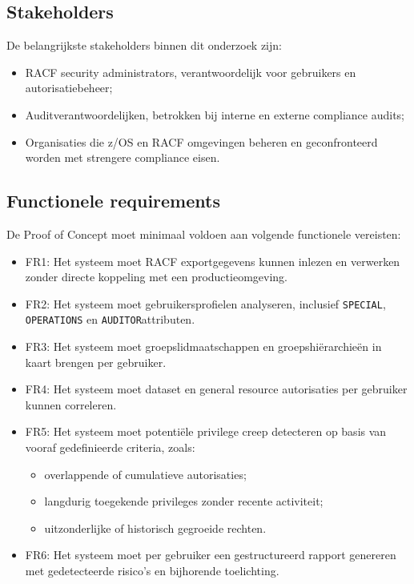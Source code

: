 \subsection{Stakeholders}

De belangrijkste stakeholders binnen dit onderzoek zijn:
\begin{itemize}
	\item RACF security administrators, verantwoordelijk voor gebruikers en autorisatiebeheer;
	\item Auditverantwoordelijken, betrokken bij interne en externe compliance audits;
	\item Organisaties die z/OS en RACF omgevingen beheren en geconfronteerd worden met strengere compliance eisen.
\end{itemize}

\subsection{Functionele requirements}

De Proof of Concept moet minimaal voldoen aan volgende functionele vereisten:

\begin{itemize}
	\item FR1: Het systeem moet RACF exportgegevens kunnen inlezen en verwerken zonder directe koppeling met een productieomgeving.
	\item FR2: Het systeem moet gebruikersprofielen analyseren, inclusief \texttt{SPECIAL}, \texttt{OPERATIONS} en \texttt{AUDITOR}attributen.
	\item FR3: Het systeem moet groepslidmaatschappen en groepshiërarchieën in kaart brengen per gebruiker.
	\item FR4: Het systeem moet dataset en general resource autorisaties per gebruiker kunnen correleren.
	\item FR5: Het systeem moet potentiële privilege creep detecteren op basis van vooraf gedefinieerde criteria, zoals:
	\begin{itemize}
		\item overlappende of cumulatieve autorisaties;
		\item langdurig toegekende privileges zonder recente activiteit;
		\item uitzonderlijke of historisch gegroeide rechten.
	\end{itemize}
	\item FR6: Het systeem moet per gebruiker een gestructureerd rapport genereren met gedetecteerde risico’s en bijhorende toelichting.
\end{itemize}

